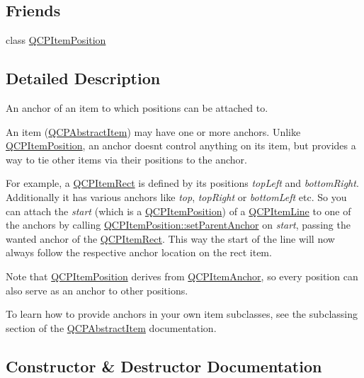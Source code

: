 \subsection*{Friends}
\begin{DoxyCompactItemize}
\item 
class \hyperlink{class_q_c_p_item_anchor_aa9b8ddc062778e202a0be06a57d18d17}{Q\+C\+P\+Item\+Position}
\end{DoxyCompactItemize}


\subsection{Detailed Description}
An anchor of an item to which positions can be attached to. 

An item (\hyperlink{class_q_c_p_abstract_item}{Q\+C\+P\+Abstract\+Item}) may have one or more anchors. Unlike \hyperlink{class_q_c_p_item_position}{Q\+C\+P\+Item\+Position}, an anchor doesn\textquotesingle{}t control anything on its item, but provides a way to tie other items via their positions to the anchor.

For example, a \hyperlink{class_q_c_p_item_rect}{Q\+C\+P\+Item\+Rect} is defined by its positions {\itshape top\+Left} and {\itshape bottom\+Right}. Additionally it has various anchors like {\itshape top}, {\itshape top\+Right} or {\itshape bottom\+Left} etc. So you can attach the {\itshape start} (which is a \hyperlink{class_q_c_p_item_position}{Q\+C\+P\+Item\+Position}) of a \hyperlink{class_q_c_p_item_line}{Q\+C\+P\+Item\+Line} to one of the anchors by calling \hyperlink{class_q_c_p_item_position_ac094d67a95d2dceafa0d50b9db3a7e51}{Q\+C\+P\+Item\+Position\+::set\+Parent\+Anchor} on {\itshape start}, passing the wanted anchor of the \hyperlink{class_q_c_p_item_rect}{Q\+C\+P\+Item\+Rect}. This way the start of the line will now always follow the respective anchor location on the rect item.

Note that \hyperlink{class_q_c_p_item_position}{Q\+C\+P\+Item\+Position} derives from \hyperlink{class_q_c_p_item_anchor}{Q\+C\+P\+Item\+Anchor}, so every position can also serve as an anchor to other positions.

To learn how to provide anchors in your own item subclasses, see the subclassing section of the \hyperlink{class_q_c_p_abstract_item}{Q\+C\+P\+Abstract\+Item} documentation. 

\subsection{Constructor \& Destructor Documentation}
\hypertarget{class_q_c_p_item_anchor_aeb6b681d2bf324db40a915d32ec5624f}{}
